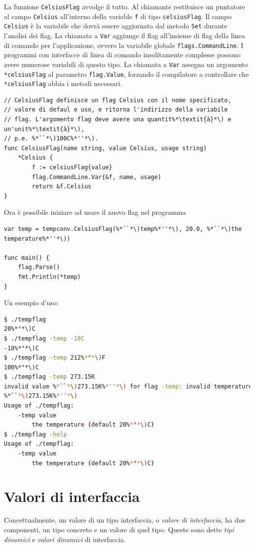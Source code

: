 La funzione \verb|CelsiusFlag| avvolge il tutto.
Al chiamante restituisce un puntatore al campo \verb|Celsius| all'interno della variable \verb|f| di tipo \verb|celsiusFlag|.
Il campo \verb|Celsius| è la variabile che dovrà essere aggiornata dal metodo \verb|Set| durante l'analisi dei flag.
La chiamata a \verb|Var| aggiunge il flag all'insieme di flag della linea di comando per l'applicazione, ovvero la variabile globale \verb|flags.CommandLine|.
I programmi con interfacce di linea di comando insolitamente complesse possono avere numerose variabili di questo tipo.
La chiamata a \verb|Var| assegna un argomento \verb|*celsiusFlag| al parametro \verb|flag.Value|, forzando il compilatore a controllare che \verb|*celsiusFlag| abbia i metodi necessari.
\begin{lstlisting}[frame=single, label={lst:lstlisting6-4.6}]
// CelsiusFlag definisce un flag Celsius con il nome specificato,
// valore di defaul e uso, e ritorna l'indirizzo della variabile
// flag. L'argomento flag deve avere una quantit%*\textit{à}*\) e un'unit%*\textit{à}*\),
// p.e. %*``*\)100C%*''*\).
func CelsiusFlag(name string, value Celsius, usage string)
    *Celsius {
        f := celsiusFlag{value}
        flag.CommandLine.Var{&f, name, usage)
        return &f.Celsius
}
\end{lstlisting}
Ora è possibile iniziare ad usare il nuovo flag nel programma
\begin{lstlisting}[frame=single, label={lst:lstlisting6-4.7}]
var temp = tempconv.CelsiusFlag(%*``*\)temp%*''*\), 20.0, %*``*\)the temperature%*''*\))

func main() {
    flag.Parse()
    fmt.Println(*temp)
}
\end{lstlisting}
Un esempio d'uso:
\begin{lstlisting}[language=bash, frame=L, label={lst:lstlisting6-4.8}]
$ ./tempflag
20%*°*\)C
$ ./tempflag -temp -18C
-18%*°*\)C
$ ./tempflag -temp 212%*°*\)F
100%*°*\)C
$ ./tempflag -temp 273.15K
invalid value %*``*\)273.15K%*''*\) for flag -temp: invalid temperature
%*``*\)273.15K%*''*\)
Usage of ./tempflag:
    -temp value
        the temperature (default 20%*°*\)C)
$ ./tempflag -help
Usage of ./tempflag:
    -temp value
        the temperature (default 20%*°*\)C)
\end{lstlisting}


\section{Valori di interfaccia}
\label{sec:valori_di_interfaccia}%
Concettualmente, un valore di un tipo interfaccia, o \textit{valore di interfaccia}, ha due componenti, un tipo concreto e un valore di quel tipo.
Queste sono dette \textit{tipi dinamici} e \textit{valori dinamici} di interfaccia.

